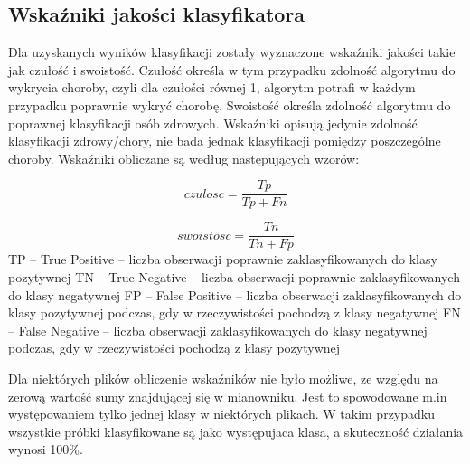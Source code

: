 \subsection{Wskaźniki jakości klasyfikatora}

Dla uzyskanych wyników klasyfikacji zostały wyznaczone wskaźniki jakości takie jak czułość i swoistość. Czułość określa w tym przypadku zdolność algorytmu do wykrycia choroby, czyli dla czułości równej 1, algorytm potrafi w każdym przypadku poprawnie wykryć chorobę. Swoistość określa zdolność algorytmu do poprawnej klasyfikacji osób zdrowych. Wskaźniki opisują jedynie zdolność klasyfikacji zdrowy/chory, nie bada jednak klasyfikacji pomiędzy poszczególne choroby. 
\newline
Wskaźniki obliczane są według następujących wzorów:

\begin{equation}
czulosc = \frac{Tp}{Tp+Fn}
\end{equation}

\begin{equation}
swoistosc = \frac{Tn}{Tn+Fp}
\end{equation}
\newline
TP – True Positive – liczba obserwacji poprawnie zaklasyfikowanych do klasy pozytywnej
\newline
TN – True Negative – liczba obserwacji poprawnie zaklasyfikowanych do klasy negatywnej
\newline
FP – False Positive – liczba obserwacji zaklasyfikowanych do klasy pozytywnej podczas, gdy w rzeczywistości pochodzą z klasy negatywnej
\newline
FN – False Negative – liczba obserwacji zaklasyfikowanych do klasy negatywnej podczas, gdy w rzeczywistości pochodzą z klasy pozytywnej


Dla niektórych plików obliczenie wskaźników nie było możliwe, ze względu na zerową wartość sumy znajdującej się w mianowniku. Jest to spowodowane m.in występowaniem tylko jednej klasy w niektórych plikach. W takim przypadku wszystkie próbki klasyfikowane są jako występujaca klasa, a skuteczność działania wynosi 100\%.

